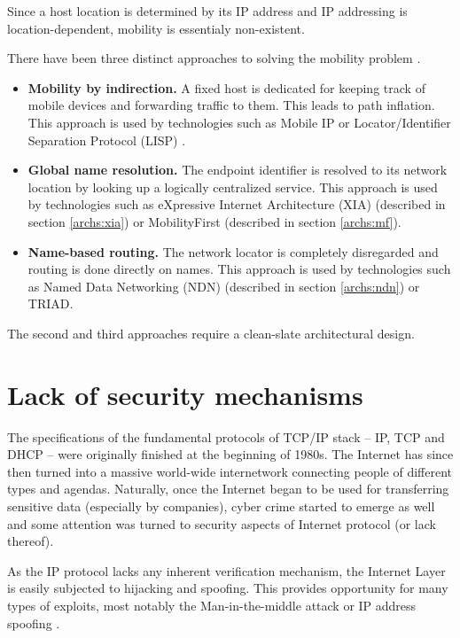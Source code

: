         Since a host location is determined by its IP address and IP addressing is location-dependent, mobility is essentialy non-existent.

        There have been three distinct approaches to solving the mobility problem \cite{MobilityFirst}.

        \begin{itemize}
            \item \textbf{Mobility by indirection.} A fixed host is dedicated for keeping track of mobile devices and forwarding traffic to them. This leads to path inflation.
            This approach is used by technologies such as Mobile IP \cite{rfc5944} or Locator/Identifier Separation Protocol (LISP) \cite{rfc6830}.
            \item \textbf{Global name resolution.} The endpoint identifier is resolved to its network location by looking up a logically centralized service.
            This approach is used by technologies such as eXpressive Internet Architecture (XIA) \cite{xia} (described in section \ref{archs:xia}) or MobilityFirst \cite{MobilityFirst} (described in section \ref{archs:mf}).
            \item \textbf{Name-based routing.} The network locator is completely disregarded and routing is done directly on names.
            This approach is used by technologies such as Named Data Networking (NDN) \cite{ndn} (described in section \ref{archs:ndn}) or TRIAD.
        \end{itemize}

        The second and third approaches require a clean-slate architectural design.

    \section{Lack of security mechanisms}\label{problems:security}

        The specifications of the fundamental protocols of TCP/IP stack -- IP, TCP and DHCP -- were originally finished at the beginning of 1980s. The Internet has since then turned into a massive world-wide internetwork connecting people of different types and agendas. Naturally, once the Internet began to be used for transferring sensitive data (especially by companies), cyber crime started to emerge as well and some attention was turned to security aspects of Internet protocol (or lack thereof).

        As the IP protocol lacks any inherent verification mechanism, the Internet Layer is easily subjected to hijacking and spoofing. This provides opportunity for many types of exploits, most notably the Man-in-the-middle attack or IP address spoofing \cite{rfc1948}.

